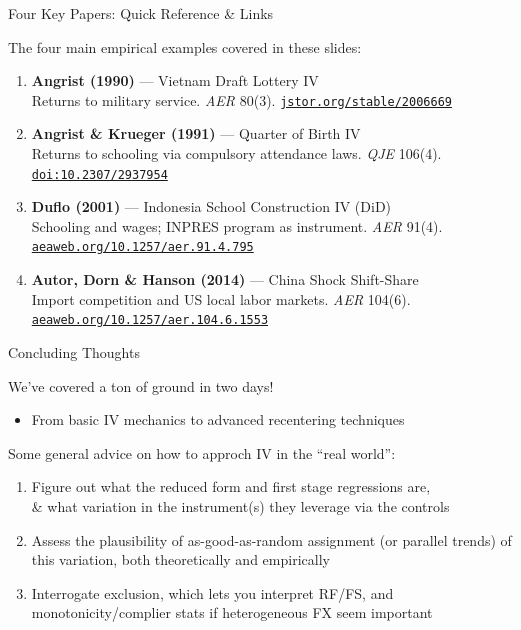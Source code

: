 \documentclass{beamer}
\begin{document}
\begin{frame}{Four Key Papers: Quick Reference \& Links}
\vspace{-0.2cm}
{\small The four main empirical examples covered in these slides:\bigskip

\begin{enumerate}\itemsep0.6em
  \item \textbf{Angrist (1990)} --- Vietnam Draft Lottery IV \\
  {\footnotesize Returns to military service. \emph{AER} 80(3). \href{https://www.jstor.org/stable/2006669}{\texttt{jstor.org/stable/2006669}}}

  \item \textbf{Angrist \& Krueger (1991)} --- Quarter of Birth IV \\
  {\footnotesize Returns to schooling via compulsory attendance laws. \emph{QJE} 106(4). \href{https://academic.oup.com/qje/article/106/4/979/1917545}{\texttt{doi:10.2307/2937954}}}

  \item \textbf{Duflo (2001)} --- Indonesia School Construction IV (DiD) \\
  {\footnotesize Schooling and wages; INPRES program as instrument. \emph{AER} 91(4). \href{https://www.aeaweb.org/articles?id=10.1257/aer.91.4.795}{\texttt{aeaweb.org/10.1257/aer.91.4.795}}}

  \item \textbf{Autor, Dorn \& Hanson (2014)} --- China Shock Shift-Share \\
  {\footnotesize Import competition and US local labor markets. \emph{AER} 104(6). \href{https://www.aeaweb.org/articles?id=10.1257/aer.104.6.1553}{\texttt{aeaweb.org/10.1257/aer.104.6.1553}}}
\end{enumerate}
}
\end{frame}


\begin{frame}{Concluding Thoughts}

We've covered a ton of ground in two days! 
\begin{itemize}
\item From basic IV mechanics to advanced recentering techniques
\end{itemize}\bigskip\pause{}

Some general advice on how to approch IV in the ``real world'':
\begin{enumerate}
\item Figure out what the reduced form and first stage regressions are, \\ \& what variation in the instrument(s) they leverage via the controls
\item Assess the plausibility of as-good-as-random assignment (or parallel trends) of this variation, both theoretically and empirically
\item Interrogate exclusion, which lets you interpret RF/FS, and monotonicity/complier stats if heterogeneous FX seem important
\end{enumerate}
\end{frame}
\end{document}
